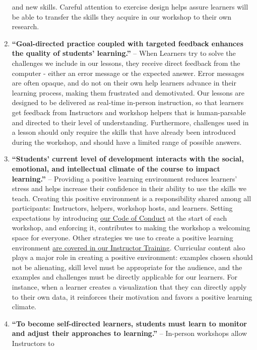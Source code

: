 \documentclass[]{book}
\begin{document}
\begin{enumerate}
  and new skills. Careful attention to exercise design helps assure learners will
  be able to transfer the
  skills they acquire in our workshop to their own research.
\item
  \textbf{``Goal-directed practice coupled with targeted feedback enhances the quality
  of students' learning.''} -- When Learners try to solve the challenges we include in our
  lessons, they receive direct feedback from the computer - either an
  error message or the expected answer. Error messages are often opaque, and
  do not on their own help learners advance in their learning process, making them
  frustrated and demotivated. Our lessons are designed to be delivered as real-time
  in-person instruction, so that learners get feedback from Instructors and workshop helpers
  that is human-parsable and directed to their level of understanding. Furthermore,
  challenges used in a lesson should only require the skills
  that have already been introduced during the workshop, and should have a limited
  range of possible answers.
\item
  \textbf{``Students' current level of development interacts with the social,
  emotional, and intellectual climate of the course to impact learning.''} -- Providing
  a positive learning environment reduces learners' stress
  and helps increase their confidence in their ability to use the skills we teach.
  Creating this positive environment is a responsibility shared among all
  participants: Instructors, helpers, workshop hosts, and learners.
  Setting expectations by introducing
  \href{https://docs.carpentries.org/topic_folders/policies/code-of-conduct.html}{our Code of Conduct}
  at the start of each workshop, and enforcing it,
  contributes to making the workshop a welcoming space for everyone.
  Other strategies we use to create a positive learning environment \href{https://carpentries.github.io/instructor-training/08-motivation/index.html}{are covered in our
  Instructor Training}.
  Curricular content also plays a major role in creating a positive environment:
  examples chosen should not be alienating, skill level must be appropriate for
  the audience, and the examples and challenges must be directly applicable
  for our learners. For instance, when a learner
  creates a visualization that they can directly apply to their own
  data, it reinforces their motivation and favors a positive learning
  climate.
\item
  \textbf{``To become self-directed learners, students must learn to monitor and adjust
  their approaches to learning.''} -- In-person workshops allow Instructors to

\end{enumerate}
\end{document}
